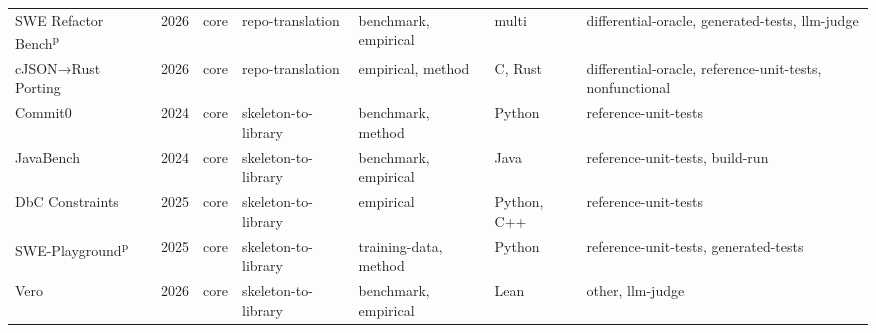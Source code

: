{\begin{longtable}{@{}p{2.8cm}lllp{1.9cm}p{1.5cm}p{2.9cm}@{}}
SWE Refactor Bench\textsuperscript{p}~\cite{SWERefactorBench2026} & 2026 & core & repo-translation & benchmark, empirical & multi & differential-oracle, generated-tests, llm-judge \\
cJSON→Rust Porting~\cite{cJSONRustPorting2026} & 2026 & core & repo-translation & empirical, method & C, Rust & differential-oracle, reference-unit-tests, nonfunctional \\
Commit0~\cite{Commit02024} & 2024 & core & skeleton-to-library & benchmark, method & Python & reference-unit-tests \\
JavaBench~\cite{JavaBench2024} & 2024 & core & skeleton-to-library & benchmark, empirical & Java & reference-unit-tests, build-run \\
DbC Constraints~\cite{DbCConstraints2025} & 2025 & core & skeleton-to-library & empirical & Python, C++ & reference-unit-tests \\
SWE-Playground\textsuperscript{p}~\cite{SWEPlayground2025} & 2025 & core & skeleton-to-library & training-data, method & Python & reference-unit-tests, generated-tests \\
Vero~\cite{Vero2026} & 2026 & core & skeleton-to-library & benchmark, empirical & Lean & other, llm-judge \\
\bottomrule
\end{longtable}
}
